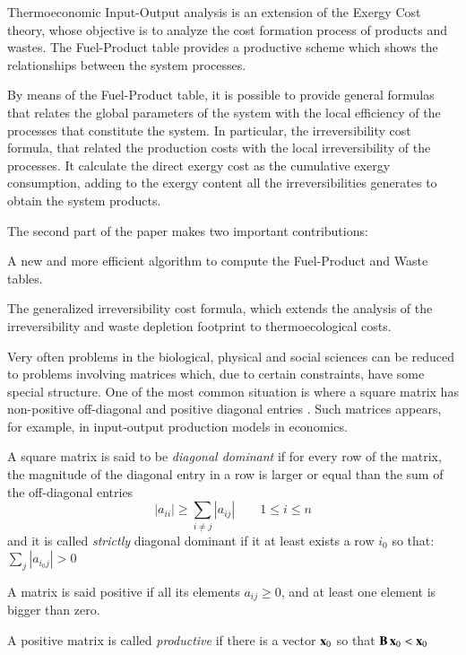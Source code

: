\documentclass{ecos2018}
\begin{document}
Thermoeconomic Input-Output analysis is an extension of the Exergy Cost theory, whose objective is to analyze the cost formation process of products and wastes. The Fuel-Product table provides a productive scheme which shows the relationships between the system processes.

By means of the Fuel-Product table, it is possible to provide general formulas that relates the global parameters of the system with the local efficiency of the processes that constitute the system. In particular, the irreversibility cost formula, that related the production costs with the local irreversibility of the processes. It calculate the direct exergy cost as the cumulative exergy consumption, adding to the exergy content all the irreversibilities generates to obtain the system products.

The second part of the paper makes two important contributions:
\begin{elist}
	\item A new and more efficient algorithm to compute the Fuel-Product and Waste tables.
	\item The generalized irreversibility cost formula, which extends the analysis of the irreversibility and waste depletion footprint to thermoecological costs.
\end{elist}

\apendice
Very often problems in the biological, physical and social sciences can be reduced to problems involving matrices which, due to certain constraints, have some special structure. One of the most common situation is where a square matrix has non-positive off-diagonal and positive diagonal entries \cite{Plemmons74}. Such matrices appears, for example, in input-output production models in economics.

A square matrix  is said to be \emph{diagonal dominant} if for every row of the matrix, the magnitude of the diagonal entry in a row is larger or equal than the sum of the off-diagonal entries
\[ \left|a_{ii}\right| \geq \sum_{i \neq j} {\left|a_{ij}\right|}
\qquad 1 \leq i \leq n \]
and it is called \emph{strictly} diagonal dominant if it at least exists a row $i_0$
so that: $\sum_{j}{\left| a_{i_0 j} \right|} > 0$

A matrix  is said positive if all its elements $a_{ij}\ge0$, and at least one element is bigger than zero.

A positive matrix  is called \emph{productive} \cite{Gale89} if there is a vector $\mathbf{x}_0$ so that
$\mathbf{B}\,\mathbf{x}_0 < \mathbf{x}_0$
\end{document}
